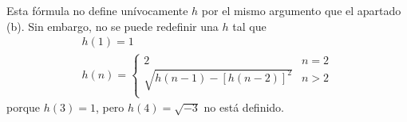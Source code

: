 \documentclass{article}
\begin{document}
Esta fórmula no define unívocamente $h$ por el mismo argumento que el apartado (b). Sin embargo, no se puede redefinir una $h$ tal que
\begin{eqnarray}
& h(1)=1 &\nonumber\\
& h(n)=\begin{cases}
2 &  n=2 \nonumber\\
\sqrt{h(n-1)-\left[h(n-2)\right]^2} & n> 2 \nonumber\\
\end{cases}
\end{eqnarray}
porque $h(3)=1$, pero $h(4)=\sqrt{-3}$ no está definido.
%
%
\end{document}
